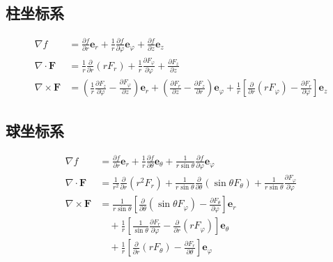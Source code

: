 \subsection{柱坐标系}
\begin{align}
    \nabla f &= \frac{\partial f}{\partial r}\boldsymbol{e}_r + \frac{1}{r}\frac{\partial f}{\partial\varphi}\boldsymbol{e}_\varphi + \frac{\partial f}{\partial z}\boldsymbol{e}_z \\
    \nabla \cdot \boldsymbol{F} &= \frac{1}{r}\frac{\partial}{\partial r}(rF_r) + \frac{1}{r}\frac{\partial F_\varphi}{\partial\varphi} + \frac{\partial F_z}{\partial z} \\
    \nabla \times \boldsymbol{F} &= \left(\frac{1}{r}\frac{\partial F_z}{\partial\varphi} - \frac{\partial F_\varphi}{\partial z}\right)\boldsymbol{e}_r + \left(\frac{\partial F_r}{\partial z} - \frac{\partial F_z}{\partial r}\right)\boldsymbol{e}_\varphi + \frac{1}{r}\left[\frac{\partial}{\partial r}(rF_\varphi) - \frac{\partial F_r}{\partial\varphi}\right]\boldsymbol{e}_z
\end{align}

\subsection{球坐标系}
\begin{align}
    \nabla f &= \frac{\partial f}{\partial r}\boldsymbol{e}_r + \frac{1}{r}\frac{\partial f}{\partial\theta}\boldsymbol{e}_\theta + \frac{1}{r\sin\theta}\frac{\partial f}{\partial\varphi}\boldsymbol{e}_\varphi \\
    \nabla \cdot \boldsymbol{F} &= \frac{1}{r^2}\frac{\partial}{\partial r}(r^2F_r) + \frac{1}{r\sin\theta}\frac{\partial}{\partial\theta}(\sin\theta F_\theta) + \frac{1}{r\sin\theta}\frac{\partial F_\varphi}{\partial\varphi} \\
    \nabla \times \boldsymbol{F} &= \frac{1}{r\sin\theta}\left[\frac{\partial}{\partial\theta}(\sin\theta F_\varphi) - \frac{\partial F_\theta}{\partial\varphi}\right]\boldsymbol{e}_r \\
    &\quad + \frac{1}{r}\left[\frac{1}{\sin\theta}\frac{\partial F_r}{\partial\varphi} - \frac{\partial}{\partial r}(rF_\varphi)\right]\boldsymbol{e}_\theta \\
    &\quad + \frac{1}{r}\left[\frac{\partial}{\partial r}(rF_\theta) - \frac{\partial F_r}{\partial\theta}\right]\boldsymbol{e}_\varphi
\end{align}


